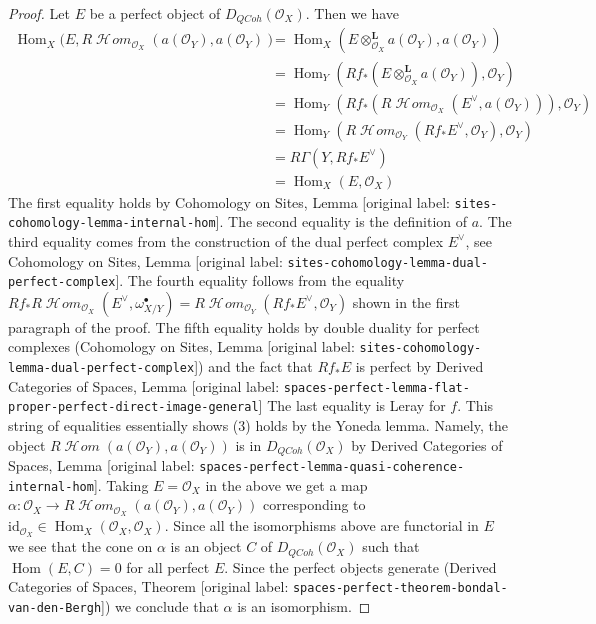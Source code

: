 \documentclass[10pt,a4paper]{article}
\theoremstyle{plain}
\theoremstyle{definition}
\theoremstyle{remark}
\numberwithin{equation}{subsection}
\def\Hom{\mathop{\mathrm{Hom}}\nolimits}
\def\SheafHom{\mathop{\mathcal{H}\!\mathit{om}}\nolimits}
\def\QCoh{\mathit{QCoh}}
\begin{document}
\begin{proof}
\medskip\noindent
Let $E$ be a perfect object of $D_\QCoh(\mathcal{O}_X)$. Then
we have
\begin{align*}
\Hom_X(E, R\SheafHom_{\mathcal{O}_X}(a(\mathcal{O}_Y), a(\mathcal{O}_Y))
& =
\Hom_X(E \otimes_{\mathcal{O}_X}^\mathbf{L} a(\mathcal{O}_Y),
a(\mathcal{O}_Y)) \\
& =
\Hom_Y(Rf_*(E \otimes_{\mathcal{O}_X}^\mathbf{L} a(\mathcal{O}_Y)),
\mathcal{O}_Y) \\
& =
\Hom_Y(Rf_*(R\SheafHom_{\mathcal{O}_X}(E^\vee, a(\mathcal{O}_Y))),
\mathcal{O}_Y) \\
& =
\Hom_Y(R\SheafHom_{\mathcal{O}_Y}(Rf_*E^\vee, \mathcal{O}_Y),
\mathcal{O}_Y) \\
& =
R\Gamma(Y, Rf_*E^\vee) \\
& =
\Hom_X(E, \mathcal{O}_X)
\end{align*}
The first equality holds by Cohomology on Sites, Lemma
\textnormal{[original label: \nolinkurl{sites-cohomology-lemma-internal-hom}]}.
The second equality is the definition of $a$.
The third equality comes from the construction of the dual perfect
complex $E^\vee$, see Cohomology on Sites, Lemma
\textnormal{[original label: \nolinkurl{sites-cohomology-lemma-dual-perfect-complex}]}.
The fourth equality follows from the equality
$Rf_*R\SheafHom_{\mathcal{O}_X}(E^\vee, \omega_{X/Y}^\bullet) =
R\SheafHom_{\mathcal{O}_Y}(Rf_*E^\vee, \mathcal{O}_Y)$
shown in the first paragraph of the proof.
The fifth equality holds by double duality for perfect complexes
(Cohomology on Sites, Lemma
\textnormal{[original label: \nolinkurl{sites-cohomology-lemma-dual-perfect-complex}]})
and the fact that $Rf_*E$ is perfect by
Derived Categories of Spaces, Lemma
\textnormal{[original label: \nolinkurl{spaces-perfect-lemma-flat-proper-perfect-direct-image-general}]}
The last equality is Leray for $f$.
This string of equalities essentially shows (3)
holds by the Yoneda lemma. Namely, the object
$R\SheafHom(a(\mathcal{O}_Y), a(\mathcal{O}_Y))$
is in $D_\QCoh(\mathcal{O}_X)$ by Derived Categories of Spaces, Lemma
\textnormal{[original label: \nolinkurl{spaces-perfect-lemma-quasi-coherence-internal-hom}]}.
Taking $E = \mathcal{O}_X$ in the above we get a map
$\alpha : \mathcal{O}_X \to
R\SheafHom_{\mathcal{O}_X}(a(\mathcal{O}_Y), a(\mathcal{O}_Y))$
corresponding to
$\text{id}_{\mathcal{O}_X} \in \Hom_X(\mathcal{O}_X, \mathcal{O}_X)$.
Since all the isomorphisms above are functorial in $E$ we
see that the cone on $\alpha$ is an object $C$ of $D_\QCoh(\mathcal{O}_X)$
such that $\Hom(E, C) = 0$ for all perfect $E$.
Since the perfect objects generate
(Derived Categories of Spaces, Theorem
\textnormal{[original label: \nolinkurl{spaces-perfect-theorem-bondal-van-den-Bergh}]})
we conclude that $\alpha$ is an isomorphism.
\end{proof}
\end{document}
